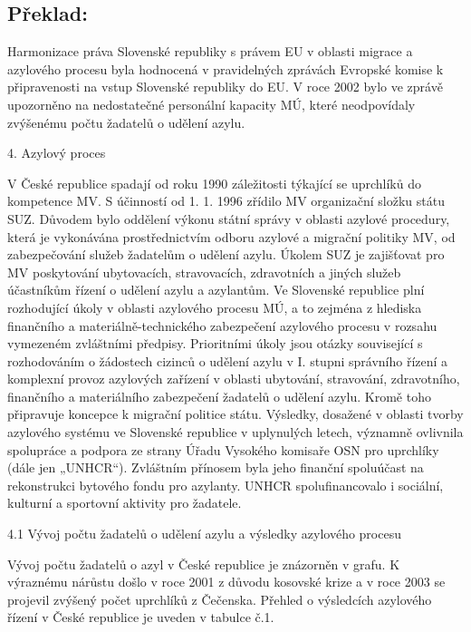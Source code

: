 \documentclass[10pt]{article}
\begin{document}
\pagebreak

\subsection*{Překlad:}

Harmonizace práva Slovenské republiky s právem EU v oblasti migrace a azylového procesu byla hodnocená v pravidelných zprávách Evropské komise k připravenosti na vstup Slovenské republiky do EU.
V roce 2002 bylo ve zprávě upozorněno na nedostatečné personální kapacity MÚ, které neodpovídaly zvýšenému počtu žadatelů o udělení azylu.


4. Azylový proces

V České republice spadají od roku 1990 záležitosti týkající se uprchlíků do kompetence MV.
S účinností od 1. 1. 1996 zřídilo MV organizační složku státu SUZ. Důvodem bylo oddělení výkonu státní správy v oblasti azylové procedury, která je vykonávána prostřednictvím odboru azylové a migrační politiky MV, od zabezpečování služeb žadatelům o udělení azylu.
Úkolem SUZ je zajišťovat pro MV poskytování ubytovacích, stravovacích, zdravotních a jiných služeb účastníkům řízení o udělení azylu a azylantům.
Ve Slovenské republice plní rozhodující úkoly v oblasti azylového procesu MÚ, a to zejména z hlediska finančního a materiálně-technického zabezpečení azylového procesu v rozsahu vymezeném zvláštními předpisy.
Prioritními úkoly jsou otázky související s rozhodováním o žádostech cizinců o udělení azylu v I. stupni správního řízení a komplexní provoz azylových zařízení v oblasti ubytování, stravování, zdravotního, finančního a materiálního zabezpečení žadatelů o udělení azylu.
Kromě toho připravuje koncepce k migrační politice státu.
Výsledky, dosažené v oblasti tvorby azylového systému ve Slovenské republice v uplynulých letech, významně ovlivnila spolupráce a podpora ze strany Úřadu Vysokého komisaře OSN pro uprchlíky (dále jen „UNHCR“).
Zvláštním přínosem byla jeho finanční spoluúčast na rekonstrukci bytového fondu pro azylanty.
UNHCR spolufinancovalo i sociální, kulturní a sportovní aktivity pro žadatele.


4.1 Vývoj počtu žadatelů o udělení azylu a výsledky azylového procesu

Vývoj počtu žadatelů o azyl v České republice je znázorněn v grafu.
K výraznému nárůstu došlo v roce 2001 z důvodu kosovské krize a v roce 2003 se projevil zvýšený počet uprchlíků z Čečenska.
Přehled o výsledcích azylového řízení v České republice je uveden v tabulce č.1.
\end{document}
